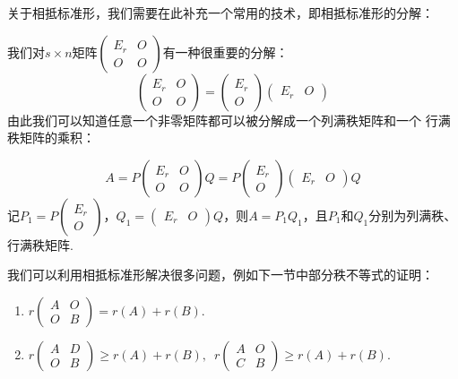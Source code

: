 关于相抵标准形，我们需要在此补充一个常用的技术，即相抵标准形的分解：

我们对$s \times n$矩阵$\begin{pmatrix}
    E_r & O \\ O & O
\end{pmatrix}$有一种很重要的分解：
\[\begin{pmatrix}
    E_r & O \\ O & O
\end{pmatrix}=\begin{pmatrix}
    E_r \\ O
\end{pmatrix}\begin{pmatrix}
    E_r & O
\end{pmatrix}\]
由此我们可以知道任意一个非零矩阵都可以被分解成一个列满秩矩阵和一个
行满秩矩阵的乘积：

\[A=P\begin{pmatrix}
    E_r & O \\ O & O
\end{pmatrix}Q=P\begin{pmatrix}
    E_r \\ O
\end{pmatrix}\begin{pmatrix}
    E_r & O
\end{pmatrix}Q\]
记$P_1=P\begin{pmatrix}
    E_r \\ O
\end{pmatrix}$，$Q_1=\begin{pmatrix}
    E_r & O
\end{pmatrix}Q$，则$A=P_1Q_1$，且$P_1$和$Q_1$分别为列满秩、行满秩矩阵.

我们可以利用相抵标准形解决很多问题，例如下一节中部分秩不等式的证明：
\begin{example}
    \begin{enumerate}
        \item $r\begin{pmatrix}
            A & O \\ O & B
        \end{pmatrix}=r(A)+r(B)$.

        \item $r\begin{pmatrix}
            A & D \\ O & B
        \end{pmatrix}\geqslant r(A)+r(B),\enspace r\begin{pmatrix}
            A & O \\ C & B
        \end{pmatrix}\geqslant r(A)+r(B)$.
    \end{enumerate}
\end{example}

